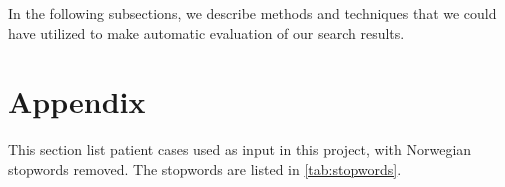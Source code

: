 \documentclass[a4paper, 12pt]{article}
\begin{document}
In the following subsections, we describe methods and techniques that we could have utilized to make automatic evaluation of our search results.


\appendix
\section{Appendix}
\label{appendix}
This section list patient cases used as input in this project, with Norwegian
stopwords removed. The stopwords are listed in \autoref{tab:stopwords}.


\end{document}
